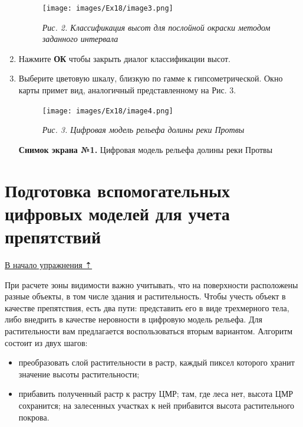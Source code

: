 \documentclass[12pt,]{book}
\begin{document}
\begin{enumerate}
  \begin{figure}
  \centering
  \texttt{[image: images/Ex18/image3.png]}
  \caption{\emph{Рис. 2. Классификация высот для послойной окраски методом заданного интервала}}
  \end{figure}
\item
  Нажмите \textbf{ОК} чтобы закрыть диалог классификации высот.
\item
  Выберите цветовую шкалу, близкую по гамме к гипсометрической. Окно карты примет вид, аналогичный представленному на Рис. 3.

  \begin{figure}
  \centering
  \texttt{[image: images/Ex18/image4.png]}
  \caption{\emph{Рис. 3. Цифровая модель рельефа долины реки Протвы}}
  \end{figure}

  \textbf{Снимок экрана №1.} Цифровая модель рельефа долины реки Протвы
\end{enumerate}

\hypertarget{threed-modelling-additional}{%
\section{Подготовка вспомогательных цифровых моделей для учета препятствий}\label{threed-modelling-additional}}

\protect\hyperlink{threed-modelling}{В начало упражнения ⇡}

При расчете зоны видимости важно учитывать, что на поверхности расположены разные объекты, в том числе здания и растительность. Чтобы учесть объект в качестве препятствия, есть два пути: представить его в виде трехмерного тела, либо внедрить в качестве неровности в цифровую модель рельефа. Для растительности вам предлагается воспользоваться вторым вариантом. Алгоритм состоит из двух шагов:

\begin{itemize}
\item
  ­преобразовать слой растительности в растр, каждый пиксел которого хранит значение высоты растительности;
\item
  прибавить полученный растр к растру ЦМР; там, где леса нет, высота ЦМР сохранится; на залесенных участках к ней прибавится высота растительного покрова.
\end{itemize}
\end{document}
